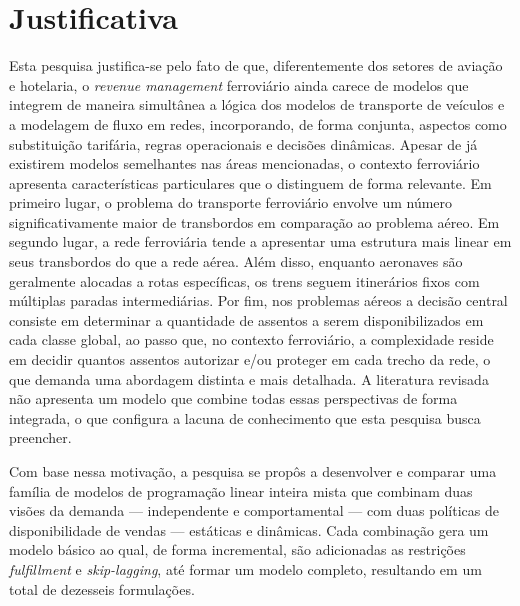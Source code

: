 \section{Justificativa}


Esta pesquisa justifica-se pelo fato de que, diferentemente dos setores de aviação e hotelaria, o \textit{revenue management} ferroviário ainda carece de modelos que integrem de maneira simultânea a lógica dos modelos de transporte de veículos e a modelagem de fluxo em redes, incorporando, de forma conjunta, aspectos como substituição tarifária, regras operacionais e decisões dinâmicas. Apesar de já existirem modelos semelhantes nas áreas mencionadas, o contexto ferroviário apresenta características particulares que o distinguem de forma relevante. Em primeiro lugar, o problema do transporte ferroviário envolve um número significativamente maior de transbordos em comparação ao problema aéreo. Em segundo lugar, a rede ferroviária tende a apresentar uma estrutura mais linear em seus transbordos do que a rede aérea. Além disso, enquanto aeronaves são geralmente alocadas a rotas específicas, os trens seguem itinerários fixos com múltiplas paradas intermediárias. Por fim, nos problemas aéreos a decisão central consiste em determinar a quantidade de assentos a serem disponibilizados em cada classe global, ao passo que, no contexto ferroviário, a complexidade reside em decidir quantos assentos autorizar e/ou proteger em cada trecho da rede, o que demanda uma abordagem distinta e mais detalhada. A literatura revisada não apresenta um modelo que combine todas essas perspectivas de forma integrada, o que configura a lacuna de conhecimento que esta pesquisa busca preencher.

Com base nessa motivação, a pesquisa se propôs a desenvolver e comparar uma família de modelos de programação linear inteira mista que combinam duas visões da demanda — independente e comportamental — com duas políticas de disponibilidade de vendas — estáticas e dinâmicas. Cada combinação gera um modelo básico ao qual, de forma incremental, são adicionadas as restrições \textit{fulfillment} e \textit{skip-lagging}, até formar um modelo completo, resultando em um total de dezesseis formulações.

